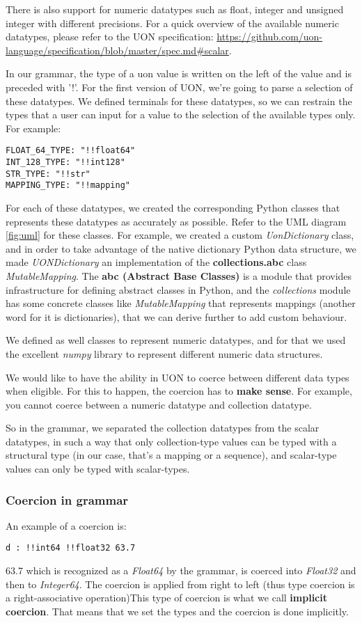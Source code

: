 \documentclass[12pt]{article}
\begin{document}
There is also support for numeric datatypes such as float, integer and unsigned integer with different precisions. For a quick overview of the available numeric datatypes, please refer to the UON specification: \url{https://github.com/uon-language/specification/blob/master/spec.md#scalar}.

In our grammar, the type of a uon value is written on the left of the value and is preceded with '!'. For the first version of UON, we're going to parse a selection of these datatypes. We defined terminals for these datatypes, so we can restrain the types that a user can input for a value to the selection of the available types only.
For example:
\begin{lstlisting}
FLOAT_64_TYPE: "!!float64"
INT_128_TYPE: "!!int128"
STR_TYPE: "!!str"
MAPPING_TYPE: "!!mapping"
\end{lstlisting}

For each of these datatypes, we created the corresponding Python classes that represents these datatypes as accurately as possible. Refer to the UML diagram \ref{fig:uml} for these classes. For example, we created a custom \emph{UonDictionary} class, and in order to take advantage of the native dictionary Python data structure, we made \emph{UONDictionary} an implementation of the \textbf{collections.abc} class \emph{MutableMapping}. The \textbf{abc (Abstract Base Classes)} is a module that provides infrastructure for defining abstract classes in Python, and the \emph{collections} module has some concrete classes like \emph{MutableMapping} that represents mappings (another word for it is dictionaries), that we can derive further to add custom behaviour.

We defined as well classes to represent numeric datatypes, and for that we used the excellent \emph{numpy} library to represent different numeric data structures.

We would like to have the ability in UON to coerce between different data types when eligible. For this to happen, the coercion has to \textbf{make sense}. For example, you cannot coerce between a numeric datatype and collection datatype. 

So in the grammar, we separated the collection datatypes from the scalar datatypes, in such a way that only collection-type values can be typed with a structural type (in our case, that's a mapping or a sequence), and scalar-type values can only be typed with scalar-types.

\subsubsection{Coercion in grammar}
An example of a coercion is:
\begin{lstlisting}
d : !!int64 !!float32 63.7
\end{lstlisting}
63.7 which is recognized as a \emph{Float64} by the grammar, is coerced into \emph{Float32} and then to \emph{Integer64}. The coercion is applied from right to left (thus type coercion is a  right-associative operation)This type of coercion is what we call 
\textbf{implicit coercion}.
That means that we set the types and the coercion is done implicitly.
\end{document}
